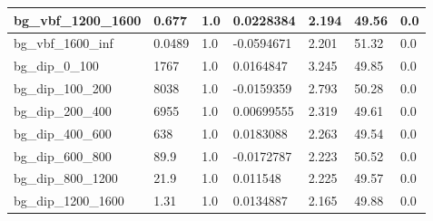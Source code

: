 \documentclass[a4paper, 10pt]{article}
\begin{document}
\begin{table}[H]
\begin{center}
\begin{tabular}{|m{23.0mm}|m{23.0mm}|m{18.0mm}|m{19.0mm}|m{19.0mm}|m{19.0mm}|m{19.0mm}|}
      \hline
      {\cellcolor{white}         bg\_vbf\_1200\_1600}& {\cellcolor{white}         0.677}& {\cellcolor{white}         1.0}& {\cellcolor{white}         0.0228384}& {\cellcolor{white}         2.194}& {\cellcolor{red}         49.56}& {\cellcolor{red}         0.0}\\
      \hline
      {\cellcolor{white}         bg\_vbf\_1600\_inf}& {\cellcolor{white}         0.0489}& {\cellcolor{white}         1.0}& {\cellcolor{white}         -0.0594671}& {\cellcolor{white}         2.201}& {\cellcolor{red}         51.32}& {\cellcolor{red}         0.0}\\
      \hline
      {\cellcolor{white}         bg\_dip\_0\_100}& {\cellcolor{white}         1767}& {\cellcolor{white}         1.0}& {\cellcolor{white}         0.0164847}& {\cellcolor{white}         3.245}& {\cellcolor{red}         49.85}& {\cellcolor{red}         0.0}\\
      \hline
      {\cellcolor{white}         bg\_dip\_100\_200}& {\cellcolor{white}         8038}& {\cellcolor{white}         1.0}& {\cellcolor{white}         -0.0159359}& {\cellcolor{white}         2.793}& {\cellcolor{red}         50.28}& {\cellcolor{red}         0.0}\\
      \hline
      {\cellcolor{white}         bg\_dip\_200\_400}& {\cellcolor{white}         6955}& {\cellcolor{white}         1.0}& {\cellcolor{white}         0.00699555}& {\cellcolor{white}         2.319}& {\cellcolor{red}         49.61}& {\cellcolor{red}         0.0}\\
      \hline
      {\cellcolor{white}         bg\_dip\_400\_600}& {\cellcolor{white}         638}& {\cellcolor{white}         1.0}& {\cellcolor{white}         0.0183088}& {\cellcolor{white}         2.263}& {\cellcolor{red}         49.54}& {\cellcolor{red}         0.0}\\
      \hline
      {\cellcolor{white}         bg\_dip\_600\_800}& {\cellcolor{white}         89.9}& {\cellcolor{white}         1.0}& {\cellcolor{white}         -0.0172787}& {\cellcolor{white}         2.223}& {\cellcolor{red}         50.52}& {\cellcolor{red}         0.0}\\
      \hline
      {\cellcolor{white}         bg\_dip\_800\_1200}& {\cellcolor{white}         21.9}& {\cellcolor{white}         1.0}& {\cellcolor{white}         0.011548}& {\cellcolor{white}         2.225}& {\cellcolor{red}         49.57}& {\cellcolor{red}         0.0}\\
      \hline
      {\cellcolor{white}         bg\_dip\_1200\_1600}& {\cellcolor{white}         1.31}& {\cellcolor{white}         1.0}& {\cellcolor{white}         0.0134887}& {\cellcolor{white}         2.165}& {\cellcolor{red}         49.88}& {\cellcolor{red}         0.0}\\

\end{tabular}
\end{center}
\end{table}
\end{document}
